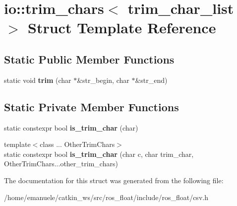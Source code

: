 \hypertarget{structio_1_1trim__chars}{}\section{io\+:\+:trim\+\_\+chars$<$ trim\+\_\+char\+\_\+list $>$ Struct Template Reference}
\label{structio_1_1trim__chars}
\subsection*{Static Public Member Functions}
\begin{DoxyCompactItemize}
\item 
\mbox{\label{structio_1_1trim__chars_a4cffc5e839ab4024ca8c8330e26e338c}} 
static void {\bfseries trim} (char $\ast$\&str\+\_\+begin, char $\ast$\&str\+\_\+end)
\end{DoxyCompactItemize}
\subsection*{Static Private Member Functions}
\begin{DoxyCompactItemize}
\item 
\mbox{\label{structio_1_1trim__chars_a8868df0aa3887f5968cab2fac9c746fb}} 
static constexpr bool {\bfseries is\+\_\+trim\+\_\+char} (char)
\item 
\mbox{\label{structio_1_1trim__chars_a4c365acae57f96990d08e9b4c6a89e48}} 
{\footnotesize template$<$class ... Other\+Trim\+Chars$>$ }\\static constexpr bool {\bfseries is\+\_\+trim\+\_\+char} (char c, char trim\+\_\+char, Other\+Trim\+Chars...\+other\+\_\+trim\+\_\+chars)
\end{DoxyCompactItemize}


The documentation for this struct was generated from the following file\+:\begin{DoxyCompactItemize}
\item 
/home/emanuele/catkin\+\_\+ws/src/ros\+\_\+float/include/ros\+\_\+float/csv.\+h\end{DoxyCompactItemize}
